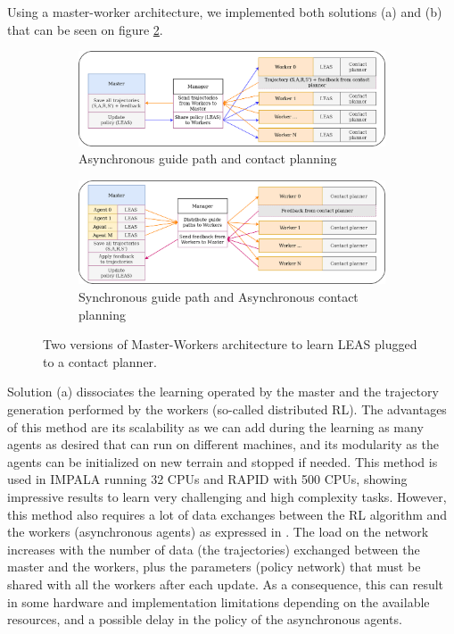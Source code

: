 Using a master-worker architecture, we implemented both solutions (a) and (b) that can be seen on figure \ref{fig:architecture_master_worker}.
\begin{figure}
    \captionsetup[subfigure]{justification=centering}
    \begin{subfigure}[t]{\linewidth}
    \includegraphics[width=\textwidth]{Figures/Chapter_LEAS/architecture_master_worker_0.png}
    \caption{Asynchronous guide path and contact planning}
    \end{subfigure}
    \begin{subfigure}[t]{\linewidth}
    \includegraphics[width=\textwidth]{Figures/Chapter_LEAS/architecture_master_worker_1.png}
    \caption{Synchronous guide path and Asynchronous contact planning}
    \label{fig:architecture_master_worker_asynchronous}
    \end{subfigure}
    \caption{Two versions of Master-Workers architecture to learn LEAS plugged to a contact planner.}
    \label{fig:architecture_master_worker}
\end{figure}

Solution (a) dissociates the learning operated by the master and the trajectory generation performed by the workers (so-called distributed RL).
The advantages of this method are its scalability as we can add during the learning as many agents as desired that can run on different machines, and its modularity as the agents can be initialized on new terrain and stopped if needed.
This method is used in IMPALA \cite{impala2018} running 32 CPUs and RAPID \cite{openai2019dota} with 500 CPUs, showing impressive results to learn very challenging and high complexity tasks.
However, this method also requires a lot of data exchanges between the RL algorithm and the workers (asynchronous agents) as expressed in \cite{evol_vs_rl_majid_2021}. 
The load on the network increases with the number of data (the trajectories) exchanged between the master and the workers, plus the parameters (policy network) that must be shared with all the workers after each update.
As a consequence, this can result in some hardware and implementation limitations depending on the available resources, and a possible delay in the policy of the asynchronous agents.

